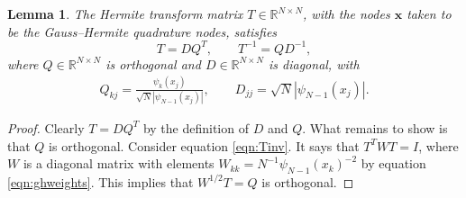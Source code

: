 \documentclass[10pt,a4paper]{amsart}
\newtheorem{lemma}{Lemma}
\begin{document}
\begin{lemma}\label{lem:orth}
The Hermite transform matrix $T \in \mathbb{R}^{N\times N}$, with the nodes $\mathbf{x}$ taken to be the Gauss--Hermite quadrature nodes, satisfies
\begin{equation}
    T = DQ^T, \qquad T^{-1} = Q D^{-1},
\end{equation}
where $Q \in \mathbb{R}^{N\times N}$ is orthogonal and $D \in \mathbb{R}^{N\times N}$ is diagonal, with
\begin{align*}
    {Q}_{kj} = \frac{\psi_k(x_j)}{\sqrt{N} \left|\psi_{N{-}1}(x_j)\right|}, \qquad {D}_{jj} = \sqrt{N}\left|\psi_{N{-}1}(x_j)\right|.
\end{align*}
\end{lemma}

\begin{proof}
Clearly $T = DQ^T$ by the definition of $D$ and $Q$. What remains to show is that $Q$ is orthogonal. Consider equation \eqref{eqn:Tinv}. It says that ${T}^T {W} {T} = {I}$, where $W$ is a diagonal matrix with elements $W_{kk} = N^{-1}\psi_{N{-}1}(x_k)^{-2}$ by equation \eqref{eqn:ghweights}. This implies that $W^{1/2}T = Q$ is orthogonal.
\end{proof}
\end{document}
